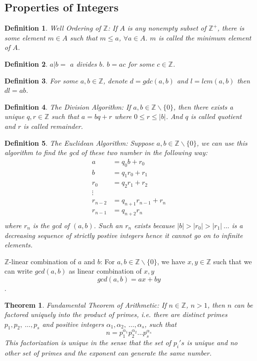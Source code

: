 \documentclass[12pt]{report}
\newtheorem{thm}{Theorem}
\newtheorem{defn}{Definition}
\begin{document}
\subsection*{Properties of Integers}
\begin{defn}
    Well Ordering of $\mathbb{Z}$: If $A$ is any nonempty subset of $\mathbb{Z^+}$, there is some element $m \in A$ such that $m \leq a$, $\forall a \in A$. $m$ is called the minimum element of $A$. 
\end{defn}
\begin{defn}
    $ a | b =$ $a$ divides $b$. $b = ac$ for some $c \in \mathbb{Z}$.
\end{defn}
\begin{defn}
    For some $a, b \in \mathbb{Z}$, denote $d = gdc(a,b)$ and $l = lcm(a,b)$ then $dl = ab$.
\end{defn}
\begin{defn}
    The Division Algorithm: If $a,b \in \mathbb{Z} \backslash \{0\}$, then there exists a unique $q,r \in \mathbb{Z}$ such that $a = bq +r$ where $0 \leq r \leq |b|$. And $q$ is called quotient and $r$ is called remainder.
\end{defn}
\begin{defn}
    The Euclidean Algorithm: Suppose $a,b \in \mathbb{Z}\backslash\{0\}$, we can use this algorithm to find the gcd of these two number in the following way:
    \begin{align*}
        a &= q_0b + r_0\\
        b &= q_1r_0 + r_1\\
        r_0 &= q_2r_1 + r_2\\
        \vdots \\
        r_{n-2} &= q_{n+1}r_{n-1} + r_{n}\\
        r_{n-1} &= q_{n+2}r_{n} \\
    \end{align*}
    where $r_n$ is the gcd of $(a,b)$. Such an $r_n$ exists because $|b| > |r_0| > |r_1| ~\dots $ is a decreasing sequence of strictly postive integers hence it cannot go on to infinite elements.
\end{defn}
$\mathbb{Z}$-linear combination of $a$ and $b$: For $a,b \in \mathbb{Z}\backslash\{0\}$, we have $x,y\in \mathbb{Z}$ such that we can write $gcd(a,b)$ as linear combination of $x,y$ $$ gcd(a,b) = ax + by$$. 
\begin{thm}
    Fundamental Theorem of Arithmetic: If $n \in \mathbb{Z}$, $n > 1$, then $n$ can be factored uniquely into the product of primes, i.e. there are distinct primes $p_1, p_2, ~\dots,p_s$ and positive integers $\alpha_1, \alpha_2, ~\dots, \alpha_s$, such that
    $$ n = p_1^{\alpha_1} p_2^{\alpha_2} \dots p_s^{\alpha_s} $$ 
    This factorization is unique in the sense that the set of $p_i's$ is unique and no other set of primes and the exponent can generate the same number.
\end{thm}
\end{document}
